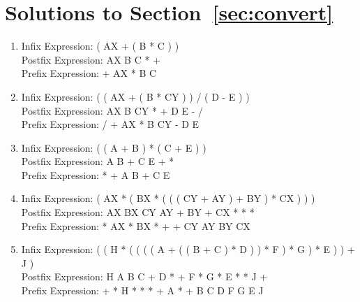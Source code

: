 \documentclass[10pt]{article}
\begin{document}
\newpage
\section{Solutions to Section~\ref{sec:convert}}

\begin{enumerate}
\item
Infix Expression: ( AX + ( B * C ) )
\\
Postfix Expression: AX B C * +
\\
Prefix Expression: + AX * B C

\item
Infix Expression: ( ( AX + ( B * CY ) ) / ( D - E ) )
\\
Postfix Expression: AX B CY * + D E - /
\\
Prefix Expression: / + AX * B CY - D E

\item
Infix Expression: ( ( A + B ) * ( C + E ) )
\\
Postfix Expression: A B + C E + *
\\
Prefix Expression: * + A B + C E

\item
Infix Expression: ( AX * ( BX * ( ( ( CY + AY ) + BY ) * CX ) ) )
\\
Postfix Expression: AX BX CY AY + BY + CX * * *
\\
Prefix Expression: * AX * BX * + + CY AY BY CX

\item
Infix Expression: ( ( H * ( ( ( ( A + ( ( B + C ) * D ) ) * F ) * G ) * E ) ) + J )
\\
Postfix Expression: H A B C + D * + F * G * E * * J +
\\
Prefix Expression: + * H * * * + A * + B C D F G E J
\end{enumerate}

\end{document}

